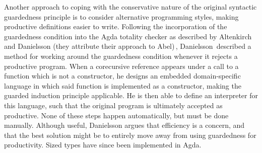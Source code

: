 Another approach to coping with the conservative nature of the original
syntactic guardedness principle is to consider alternative programming styles, making productive definitions easier to write. Following the incorporation of the guardedness condition into the Agda totality checker as described by Altenkirch and Danielsson (they attribute their approach to Abel)\,\citep{AltenkirchNAD10}, Danielsson\,\citep{Danielsson10beatingthe} described a method for working around the guardedness condition whenever it rejects a productive program. When a corecursive reference appears under a call to a function which is not a constructor, he designs an embedded domain-specific language in which said function is implemented as a constructor, making the guarded induction principle applicable. He is then able to define an interpreter for this language, such that the original program is ultimately accepted as productive. None of these steps happen automatically, but must be done manually. Although useful, Danielsson argues that efficiency is a concern, and that the best solution might be to entirely move away from using guardedness for productivity. Sized types have since been implemented in Agda.




